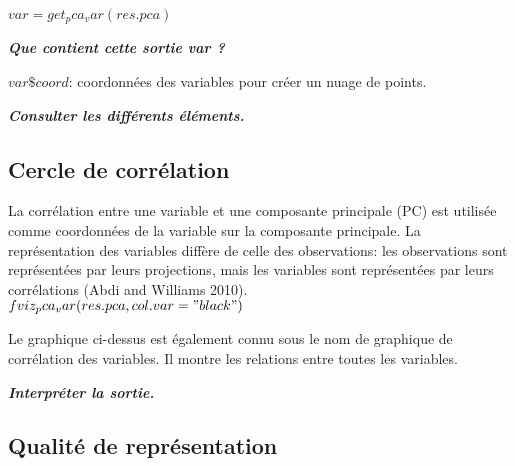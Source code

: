 \documentclass[10pt,a4paper]{report}
\begin{document}
$var= get_pca_var(res.pca)$ 

\textbf{\textit{Que contient  cette sortie var ?}}

	$var\$coord$: coordonnées des variables pour créer un nuage de points.


\textbf{\textit{Consulter les différents éléments.}} 

\subsection{Cercle de corrélation}

La corrélation entre une variable et une composante principale (PC) est utilisée comme coordonnées de la variable sur la composante principale. La représentation des variables diffère de celle des observations: les observations sont représentées par leurs projections, mais les variables sont représentées par leurs corrélations (Abdi and Williams 2010).\\

$fviz_pca_var(res.pca, col.var = "black")$

Le graphique ci-dessus est également connu sous le nom de graphique de corrélation des variables. Il montre les relations entre toutes les variables. 

\textbf{\textit{Interpréter la sortie.}}



\subsection{Qualité de représentation}
\end{document}

